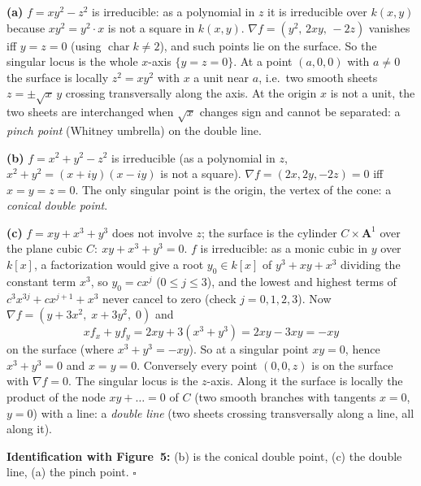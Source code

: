 \documentclass[11pt]{article}
\begin{document}
\textbf{(a)} $f=xy^2-z^2$ is irreducible: as a polynomial in $z$ it is irreducible over $k(x,y)$ because $xy^2=y^2\cdot x$ is not a square in $k(x,y)$. $\nabla f=(y^2,\,2xy,\,-2z)$ vanishes iff $y=z=0$ (using $\operatorname{char}k\ne2$), and such points lie on the surface. So the singular locus is the whole $x$-axis $\{y=z=0\}$. At a point $(a,0,0)$ with $a\neq0$ the surface is locally $z^2=xy^2$ with $x$ a unit near $a$, i.e.\ two smooth sheets $z=\pm\sqrt{x}\,y$ crossing transversally along the axis. At the origin $x$ is not a unit, the two sheets are interchanged when $\sqrt x$ changes sign and cannot be separated: a \emph{pinch point} (Whitney umbrella) on the double line.

\textbf{(b)} $f=x^2+y^2-z^2$ is irreducible (as a polynomial in $z$, $x^2+y^2=(x+iy)(x-iy)$ is not a square). $\nabla f=(2x,2y,-2z)=0$ iff $x=y=z=0$. The only singular point is the origin, the vertex of the cone: a \emph{conical double point}.

\textbf{(c)} $f=xy+x^3+y^3$ does not involve $z$; the surface is the cylinder $C\times\mathbf A^1$ over the plane cubic $C:\ xy+x^3+y^3=0$. $f$ is irreducible: as a monic cubic in $y$ over $k[x]$, a factorization would give a root $y_0\in k[x]$ of $y^3+xy+x^3$ dividing the constant term $x^3$, so $y_0=cx^j$ ($0\le j\le3$), and the lowest and highest terms of $c^3x^{3j}+cx^{j+1}+x^3$ never cancel to zero (check $j=0,1,2,3$). Now $\nabla f=(y+3x^2,\;x+3y^2,\;0)$ and
\[
xf_x+yf_y=2xy+3(x^3+y^3)=2xy-3xy=-xy
\]
on the surface (where $x^3+y^3=-xy$). So at a singular point $xy=0$, hence $x^3+y^3=0$ and $x=y=0$. Conversely every point $(0,0,z)$ is on the surface with $\nabla f=0$. The singular locus is the $z$-axis. Along it the surface is locally the product of the node $xy+\dots=0$ of $C$ (two smooth branches with tangents $x=0$, $y=0$) with a line: a \emph{double line} (two sheets crossing transversally along a line, all along it).

\textbf{Identification with Figure~5:} (b) is the conical double point, (c) the double line, (a) the pinch point. \hfill$\square$
\end{document}
